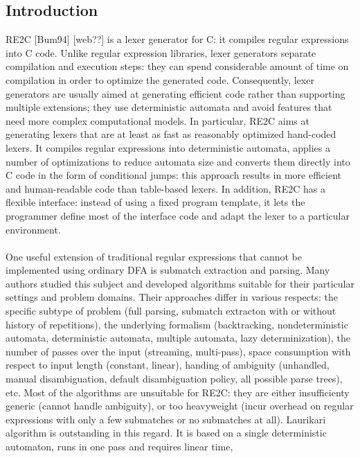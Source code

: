\documentclass{article}
\theoremstyle{definition}
\begin{document}
\begin{multicols}{2}

\section*{Introduction}

RE2C [Bum94] [web??] is a lexer generator for C: it compiles regular expressions into C code.
Unlike regular expression libraries, lexer generators separate compilation and execution steps:
they can spend considerable amount of time on compilation in order to optimize the generated code.
Consequently, lexer generators are usually aimed at generating efficient code rather than supporting multiple extensions;
they use deterministic automata and avoid features that need more complex computational models.
In particular, RE2C aims at generating lexers that are at least as fast as reasonably optimized hand-coded lexers.
It compiles regular expressions into deterministic automata,
applies a number of optimizations to reduce automata size
and converts them directly into C code in the form of conditional jumps:
this approach results in more efficient and human-readable code than table-based lexers.
In addition, RE2C has a flexible interface:
instead of using a fixed program template,
it lets the programmer define most of the interface code
and adapt the lexer to a particular environment.
\\ \\
One useful extension of traditional regular expressions that cannot be implemented using ordinary DFA is submatch extraction and parsing.
Many authors studied this subject and developed algorithms suitable for their particular settings and problem domains.
Their approaches differ in various respects:
the specific subtype of problem (full parsing, submatch extracton with or without history of repetitions),
the underlying formalism (backtracking,
nondeterministic automata, deterministic automata, 
multiple automata, lazy determinization),
the number of passes over the input (streaming, multi-pass),
space consumption with respect to input length (constant, linear),
handing of ambiguity (unhandled, manual disambiguation, default disambiguation policy, all possible parse trees), etc.
Most of the algorithms are unsuitable for RE2C: they are either insufficienty generic (cannot handle ambiguity),
or too heavyweight (incur overhead on regular expressions with only a few submatches or no submatches at all).
Laurikari algorithm is outstanding in this regard.
It is based on a single deterministic automaton, runs in one pass and requires linear time,

\end{multicols}
\end{document}
